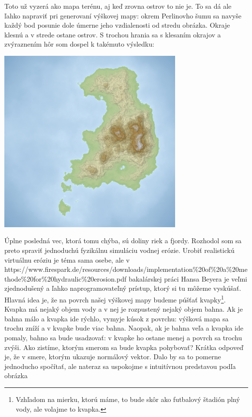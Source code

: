 Toto už vyzerá ako mapa terénu, aj keď zrovna ostrov to nie je. To sa dá ale ľahko napraviť pri generovaní
výškovej mapy: okrem Perlinovho šumu sa navyše každý bod posunie dole úmerne jeho vzdialenosti od stredu 
obrázka. Okraje klesnú a v strede ostane ostrov. S trochou hrania sa s klesaním okrajov
a zvýraznením hôr som dospel k takémuto
výsledku:\\


\centerline{
  \includegraphics[width=0.7\textwidth]{data/86_rendered_dry.png}
}


Úplne posledná vec, ktorá tomu chýba, sú doliny riek a fjordy. Rozhodol som sa preto spraviť jednoduchú
fyzikálnu simuláciu vodnej erózie. Urobiť realistickú virtuálnu eróziu je téma sama osebe, ale 
v \link%
{https://www.firespark.de/resources/downloads/implementation\%20of\%20a\%20methode\%20for\%20hydraulic\%20erosion.pdf}%
{bakalárskej práci Hansa Beyera}
je veľmi zjednodušený a ľahko naprogramovateľný prístup, ktorý si tu môžeme vyskúšať.
Hlavná idea je, že na povrch našej výškovej mapy budeme púšťať kvapky\footnote{
  Vzhľadom na mierku, ktorú máme, to bude skôr ako futbalový štadión plný vody, ale
  volajme to kvapka.}. Kvapka má nejaký objem vody a v nej je rozpustený nejaký objem 
bahna. Ak je bahna málo a kvapka ide rýchlo, vymyje kúsok z povrchu: výšková mapa sa trochu 
zníží a v kvapke bude viac bahna. Naopak, ak je bahna veľa a kvapka ide pomaly, bahno sa bude
usadzovať: v kvapke ho ostane menej a povrch sa trochu zvýši.
Ako zistíme, ktorým smerom sa bude kvapka pohybovať? Krátka odpoveď je, že v smere, ktorým
ukazuje normálový vektor. Dalo by sa to pomerne jednoducho spočítať, ale nateraz sa uspokojme
s intuitívnou predstavou podľa obrázka




